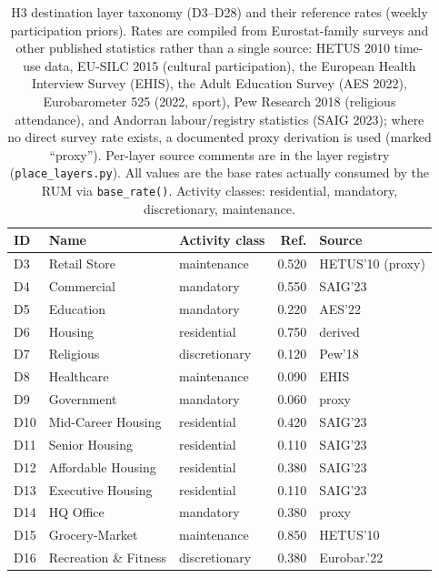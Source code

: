 \documentclass[a4paper,12pt]{article}
\begin{document}
\begin{table}[H]
\caption{H3 destination layer taxonomy (D3--D28) and their reference rates
(weekly participation priors). Rates are compiled from Eurostat-family surveys
and other published statistics rather than a single source: HETUS 2010 time-use
data, EU-SILC 2015 (cultural participation), the European Health Interview Survey
(EHIS), the Adult Education Survey (AES 2022), Eurobarometer 525 (2022, sport),
Pew Research 2018 (religious attendance), and Andorran labour/registry statistics
(SAIG 2023); where no direct survey rate exists, a documented proxy derivation is
used (marked ``proxy''). Per-layer source comments are in the layer registry
(\texttt{place\_layers.py}). All values are the base rates actually consumed by the
RUM via \texttt{base\_rate()}. Activity classes: residential, mandatory,
discretionary, maintenance.}
\label{tab:place_layers}
\begin{tabularx}{\textwidth}{p{0.7cm}p{3.3cm}Xr l}
\toprule
\textbf{ID} & \textbf{Name} & \textbf{Activity class} & \textbf{Ref.} & \textbf{Source} \\
\midrule
D3  & Retail Store         & maintenance    & 0.520 & HETUS'10 (proxy) \\
D4  & Commercial           & mandatory      & 0.550 & SAIG'23 \\
D5  & Education            & mandatory      & 0.220 & AES'22 \\
D6  & Housing              & residential    & 0.750 & derived \\
D7  & Religious            & discretionary  & 0.120 & Pew'18 \\
D8  & Healthcare           & maintenance    & 0.090 & EHIS \\
D9  & Government           & mandatory      & 0.060 & proxy \\
D10 & Mid-Career Housing   & residential    & 0.420 & SAIG'23 \\
D11 & Senior Housing       & residential    & 0.110 & SAIG'23 \\
D12 & Affordable Housing   & residential    & 0.380 & SAIG'23 \\
D13 & Executive Housing    & residential    & 0.110 & SAIG'23 \\
D14 & HQ Office            & mandatory      & 0.380 & proxy \\
D15 & Grocery-Market       & maintenance    & 0.850 & HETUS'10 \\
D16 & Recreation \& Fitness & discretionary & 0.380 & Eurobar.'22 \\

\end{tabularx}
\end{table}
\end{document}
